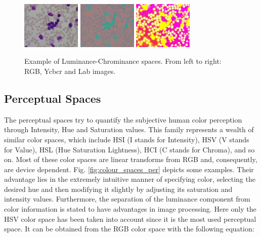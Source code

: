 \begin{figure}[!h]
	\centering
	\includegraphics[width=0.25\textwidth]{images/figcs_rgb}
	\includegraphics[width=0.25\textwidth]{images/figcs_ycbcr}
	\includegraphics[width=0.25\textwidth]{images/figcs_lab}
	\caption[Example of Luminance-Chrominance spaces.]{\label{fig:colour_spaces_lum}Example of Luminance-Chrominance spaces. From left to right: RGB, Ycbcr and Lab images.}
\end{figure}


\subsection{Perceptual Spaces}  %
The perceptual spaces try to quantify the subjective human color perception through Intensity, Hue and Saturation values. This family represents a wealth of similar color spaces, which include HSI (I stands for Intensity), HSV (V stands for Value), HSL (Hue Saturation Lightness), HCI (C stands for Chroma), and so on. Most of these color spaces are linear transforms from RGB and, consequently, are device dependent. Fig. \ref{fig:colour_spaces_per} depicts some examples. Their advantage lies in the extremely intuitive manner of specifying color, selecting the desired hue and then modifying it slightly by adjusting its saturation and intensity values.
Furthermore, the separation of the luminance component from color information is stated to have advantages in image processing. Here only the HSV color space has been taken into account since it is the most used perceptual space. It can be obtained from the RGB color space with the following equation:

